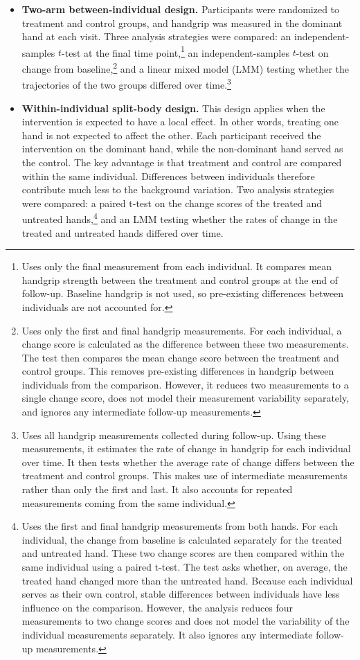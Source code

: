 \documentclass[twocolumn]{article} %
\begin{document}
\begin{itemize}
	\item[-] \textbf{Two-arm between-individual design.} Participants were randomized to treatment and control groups, and handgrip was measured in the dominant hand at each visit. Three analysis strategies were compared: an independent-samples $t$-test at the final time point,\footnote{Uses only the final measurement from each individual. It compares mean handgrip strength between the treatment and control groups at the end of follow-up. Baseline handgrip is not used, so pre-existing differences between individuals are not accounted for.} an independent-samples $t$-test on change from baseline,\footnote{Uses only the first and final handgrip measurements. For each individual, a change score is calculated as the difference between these two measurements. The test then compares the mean change score between the treatment and control groups. This removes pre-existing differences in handgrip between individuals from the comparison. However, it reduces two measurements to a single change score, does not model their measurement variability separately, and ignores any intermediate follow-up measurements.} and a linear mixed model (LMM) testing whether the trajectories of the two groups differed over time.\footnote{Uses all handgrip measurements collected during follow-up. Using these measurements, it estimates the rate of change in handgrip for each individual over time. It then tests whether the average rate of change differs between the treatment and control groups. This makes use of intermediate measurements rather than only the first and last. It also accounts for repeated measurements coming from the same individual.}
	
	\item[-] \textbf{Within-individual split-body design.} This design applies when the intervention is expected to have a local effect. In other words, treating one hand is not expected to affect the other. Each participant received the intervention on the dominant hand, while the non-dominant hand served as the control. The key advantage is that treatment and control are compared within the same individual. Differences between individuals therefore contribute much less to the background variation. Two analysis strategies were compared: a paired t-test on the change scores of the treated and untreated hands,\footnote{Uses the first and final handgrip measurements from both hands. For each individual, the change from baseline is calculated separately for the treated and untreated hand. These two change scores are then compared within the same individual using a paired t-test. The test asks whether, on average, the treated hand changed more than the untreated hand. Because each individual serves as their own control, stable differences between individuals have less influence on the comparison. However, the analysis reduces four measurements to two change scores and does not model the variability of the individual measurements separately. It also ignores any intermediate follow-up measurements.} and an LMM testing whether the rates of change in the treated and untreated hands differed over time.


\end{itemize}
\end{document}
